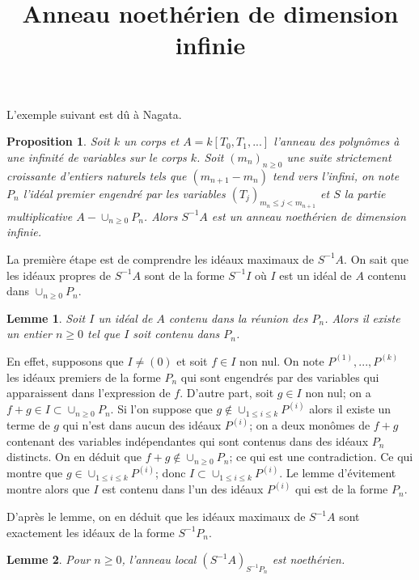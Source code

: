 \documentclass{article}
\newtheorem{proposition}{Proposition}
\newtheorem{lemme}{Lemme}
\begin{document}
\title{Anneau noethérien de dimension infinie}
\maketitle

L'exemple suivant est dû à Nagata.
\begin{proposition}
Soit $k$ un corps et $A = k[T_0, T_1, ...]$ l'anneau des polynômes à une infinité de variables sur le corps $k$. Soit $(m_n)_{n \geq 0}$ une suite strictement croissante d'entiers naturels tels que $( m_{n+1} - m_n )$ tend vers l'infini, on note $P_n$ l'idéal premier engendré par les variables $(T_j)_{m_n \leq j < m_{n+1}}$ et $S$ la partie multiplicative $A-\cup_{n \geq 0}P_n$. Alors $S^{-1}A$ est un anneau noethérien de dimension infinie.
\end{proposition}

La première étape est de comprendre les idéaux maximaux de $S^{-1}A$.
On sait que les idéaux propres de $S^{-1}A$ sont de la forme $S^{-1}I$ où $I$ est un idéal de $A$ contenu dans $\cup_{n \geq 0}P_n$.

\begin{lemme}
Soit $I$ un idéal de $A$ contenu dans la réunion des $P_n$. Alors il existe un entier $n \geq 0$ tel que $I$ soit contenu dans $P_n$.
\end{lemme}

En effet, supposons que $I \neq (0)$ et soit $f \in I$ non nul. On note $P^{(1)}, ..., P^{(k)}$ les idéaux premiers de la forme $P_n$ qui sont engendrés par des variables qui apparaissent dans l'expression de $f$. D'autre part, soit $g \in I$ non nul; on a $f+g \in I \subset \cup_{n \geq 0}P_n$. Si l'on suppose que $g \not\in \cup_{1 \leq i \leq k}P^{(i)}$ alors il existe un terme de $g$ qui n'est dans aucun des idéaux $P^{(i)}$; on a deux monômes de $f+g$ contenant des variables indépendantes qui sont contenus dans des idéaux $P_n$ distincts. On en déduit que $f+g \not\in \cup_{n \geq 0}P_n$; ce qui est une contradiction. Ce qui montre que $g \in \cup_{1 \leq i \leq k}P^{(i)}$; donc $I \subset \cup_{1 \leq i \leq k}P^{(i)}$. Le lemme d'évitement montre alors que $I$ est contenu dans l'un des idéaux $P^{(i)}$ qui est de la forme $P_n$.

D'après le lemme, on en déduit que les idéaux maximaux de $S^{-1}A$ sont exactement les idéaux de la forme $S^{-1}P_n$.
\begin{lemme}
Pour $n \geq 0$, l'anneau local $(S^{-1}A)_{S^{-1}P_n}$ est noethérien.
\end{lemme}
\end{document}
